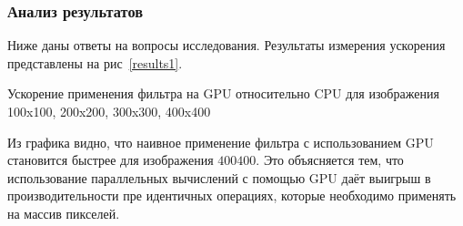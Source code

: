 %



\subsubsection*{Анализ результатов}
\noindent Ниже даны ответы на вопросы исследования.
Результаты измерения ускорения представлены на рис~\ref{results1}.

\begin{table}
  \centering

\caption{Ускорение применения фильтра на GPU относительно CPU для изображения 100x100, 200x200, 300x300, 400x400}
\label{results1}
\end{table}

Из графика видно, что наивное применение фильтра с использованием GPU становится быстрее для изображения $400$\times$400$. Это объясняется тем, что использование параллельных вычислений с помощью GPU даёт выигрыш в производительности пре идентичных операциях, которые необходимо применять на массив пикселей.
